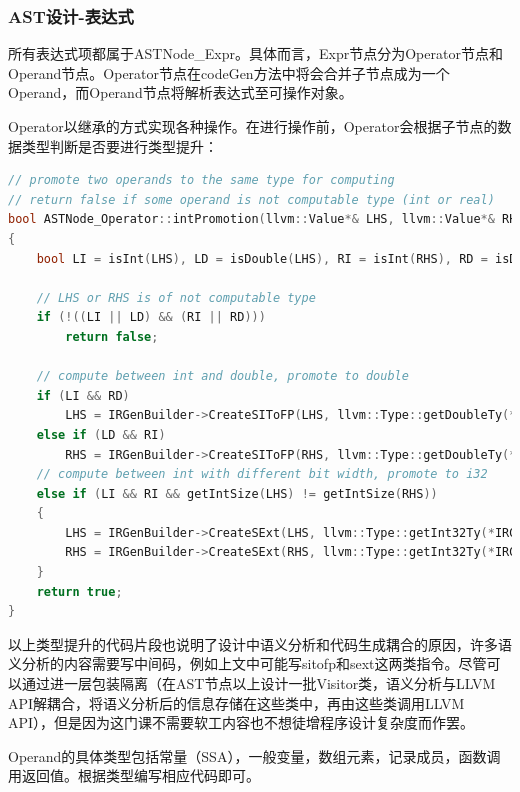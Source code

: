 \documentclass{article}
\begin{document}
\subsubsection{AST设计-表达式}
\par 所有表达式项都属于ASTNode\_Expr。具体而言，Expr节点分为Operator节点和Operand节点。Operator节点在codeGen方法中将会合并子节点成为一个Operand，而Operand节点将解析表达式至可操作对象。
\par Operator以继承的方式实现各种操作。在进行操作前，Operator会根据子节点的数据类型判断是否要进行类型提升：
\begin{lstlisting}[language=C++]
// promote two operands to the same type for computing
// return false if some operand is not computable type (int or real)
bool ASTNode_Operator::intPromotion(llvm::Value*& LHS, llvm::Value*& RHS)
{
    bool LI = isInt(LHS), LD = isDouble(LHS), RI = isInt(RHS), RD = isDouble(RHS);

    // LHS or RHS is of not computable type
    if (!((LI || LD) && (RI || RD)))
        return false;

    // compute between int and double, promote to double
    if (LI && RD)
        LHS = IRGenBuilder->CreateSIToFP(LHS, llvm::Type::getDoubleTy(*IRGenContext), "sitofp");
    else if (LD && RI)
        RHS = IRGenBuilder->CreateSIToFP(RHS, llvm::Type::getDoubleTy(*IRGenContext), "sitofp");
    // compute between int with different bit width, promote to i32
    else if (LI && RI && getIntSize(LHS) != getIntSize(RHS))
    {
        LHS = IRGenBuilder->CreateSExt(LHS, llvm::Type::getInt32Ty(*IRGenContext), "sext");
        RHS = IRGenBuilder->CreateSExt(RHS, llvm::Type::getInt32Ty(*IRGenContext), "sext");
    }
    return true;
}
\end{lstlisting}
以上类型提升的代码片段也说明了设计中语义分析和代码生成耦合的原因，许多语义分析的内容需要写中间码，例如上文中可能写sitofp和sext这两类指令。尽管可以通过进一层包装隔离（在AST节点以上设计一批Visitor类，语义分析与LLVM API解耦合，将语义分析后的信息存储在这些类中，再由这些类调用LLVM API），但是因为这门课不需要软工内容也不想徒增程序设计复杂度而作罢。

\par Operand的具体类型包括常量（SSA），一般变量，数组元素，记录成员，函数调用返回值。根据类型编写相应代码即可。
\end{document}
